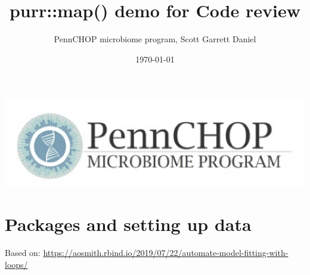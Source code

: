 \documentclass[]{article}
\title{purr::map() demo for Code review}
\author{PennCHOP microbiome program, Scott Garrett Daniel}
\date{\today}
\begin{document}
\maketitle

{
\setcounter{tocdepth}{3}
}
\includegraphics{logo_blk.png}\\
\tableofcontents

\section{Packages and setting up
data}\label{packages-and-setting-up-data}

Based on:
\url{https://aosmith.rbind.io/2019/07/22/automate-model-fitting-with-loops/}
\end{document}
